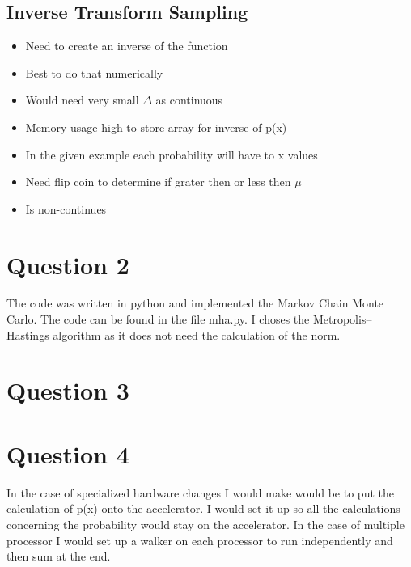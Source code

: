 \documentclass{article}
\begin{document}
\subsection{Inverse Transform Sampling}

\begin{itemize}
\itemsep-0.3cm 
\item Need to create an inverse of the function \\
\item Best to do that numerically \\
\item Would need very small $\Delta$ as continuous\\
\item Memory usage high to store array for inverse of p(x)\\
\item In the given example each probability will have to x values\\
\item Need flip coin to determine if grater then or less then $\mu$\\
\item Is non-continues \citep{ITPCDF}\citep{KKCDF}
\end{itemize}

\section{Question 2}

The code was written in python and implemented the Markov Chain Monte Carlo. The code can be found in the file mha.py. I choses the Metropolis–Hastings algorithm as it does not need the calculation of the norm. 

\section{Question 3}


\section{Question 4}

In the case of specialized hardware changes I would make would be to put the calculation of p(x) onto the accelerator. I would set it up so all the calculations concerning the probability would stay on the accelerator.  In the case of multiple processor I would set up a walker on each processor to run independently and then sum at the end.



{}%
\end{document}
